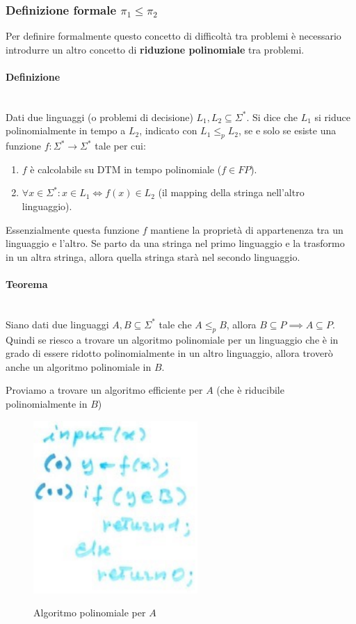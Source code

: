 \documentclass{article}
\begin{document}
\subsubsection{Definizione formale $\pi_1\leq\pi_2$}
Per definire formalmente questo concetto di difficoltà tra problemi è necessario introdurre
un altro concetto di \textbf{riduzione polinomiale} tra problemi.
\paragraph{Definizione}\mbox{}\\
Dati due linguaggi (o problemi di decisione) $L_1,L_2\subseteq\Sigma^*$. Si dice che
$L_1$ si riduce polinomialmente in tempo a $L_2$, indicato con $L_1\leq_{p} L_2$,
se e solo se esiste una funzione $f:\Sigma^*\rightarrow\Sigma^*$ tale per cui:
\begin{enumerate}
    \item $f$ è calcolabile su DTM in tempo polinomiale ($f\in FP$).
    \item $\forall x\in\Sigma^*:x\in L_1\Leftrightarrow f(x)\in L_2$ (il mapping della
    stringa nell'altro linguaggio).
\end{enumerate}
Essenzialmente questa funzione $f$ mantiene la proprietà di appartenenza tra un linguaggio
e l'altro. Se parto da una stringa nel primo linguaggio e la trasformo in un altra stringa,
allora quella stringa starà nel secondo linguaggio.

\paragraph{Teorema}\mbox{}\\
Siano dati due linguaggi $A,B\subseteq\Sigma^*$ tale che $A\leq_p B$, allora
$B\subseteq P\implies A\subseteq P$. Quindi se riesco a trovare un algoritmo polinomiale
per un linguaggio che è in grado di essere ridotto polinomialmente in un altro linguaggio,
allora troverò anche un algoritmo polinomiale in $B$.

Proviamo a trovare un algoritmo efficiente per $A$ (che è riducibile polinomialmente in $B$)
\begin{figure}[H]
    \centering
    \includegraphics[scale=0.6]{images/algo_det_daf.png}
    \label{alg:1}
    \caption{Algoritmo polinomiale per $A$}
\end{figure}
\end{document}

